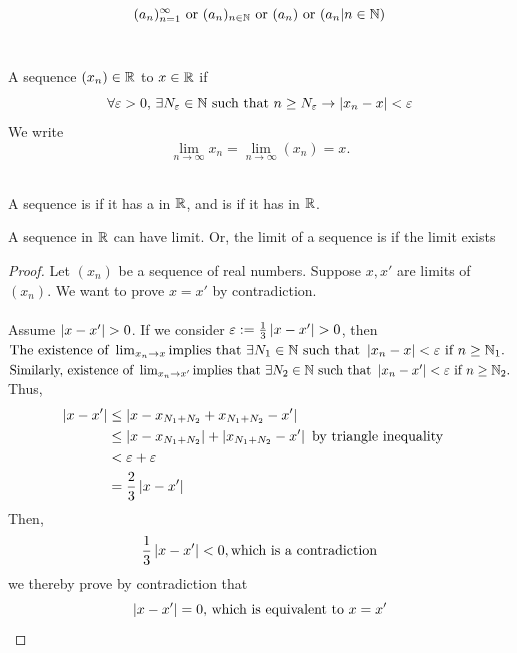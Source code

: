 \documentclass[a4paper,12pt]{article}
\begin{document}
\begin{notation}

\[(a_n)_{n=1}^\infty  \text{ or }  (a_n)_{n\in\mathbb{N}}  \text{ or }  (a_n)  \text{ or }  (a_n|n\in \mathbb{N})\]\\
\end{notation}

\begin{definition}
    A sequence \((x_n)\in\mathbb{R}\)  to \(x\in\mathbb{R}\) if 
    \[\forall \varepsilon >0,\, \exists N_\varepsilon \in \mathbb{N} \text{ such that }n\ge N_\varepsilon \rightarrow\left\lvert x_n - x\right\rvert <\varepsilon\]
    We write \[\lim_{n\to\infty}x_n = \lim_{n\to\infty}(x_n) = x.\]\\
\end{definition}

\begin{definition}
    A sequence is  if it has a  in \(\mathbb{R}\), and is  if it 
    has  in $\mathbb{R}$.\\
\end{definition}

\newpage
\begin{theorem}
    A sequence in $\mathbb{R}$ can have  limit. Or, the limit of a sequence is  if the limit exists 
\end{theorem}
\begin{proof}
    Let \((x_n)\) be a sequence of real numbers. Suppose \(x,x'\) are limits of \((x_n)\). We want to prove \(x = x'\) by contradiction.
    \\\\Assume \(\left\lvert x-x'\right\rvert > 0\). If we consider \(\varepsilon := \frac{1}{3}\left\lvert x-x'\right\rvert>0\), then\\
    \indent \(\text{The existence of } \lim_{x_n \to x}\text{implies that } \exists N_1 \in \mathbb{N} \text{ such that } \left\lvert x_n-x\right\rvert < \varepsilon\text{ if }n\ge \mathbb{N}_1. \)\\
    \indent \(\text{Similarly, existence of } \lim_{x_n \to x'} \text{implies that } \exists N_2 \in \mathbb{N} \text{ such that } \left\lvert x_n-x'\right\rvert < \varepsilon\text{ if }n\ge \mathbb{N}_2. \)\\
    Thus,
    \begin{align*}
        \left\lvert x-x'\right\rvert & \le \left\lvert x-x_{N_1+N_2}+x_{N_1+N_2}-x'\right\rvert & \\
                   & \le \left\lvert x-x_{N_1+N_2}\right\rvert+\left\lvert x_{N_1+N_2}-x'\right\rvert \text{ by triangle inequality}\\
                   & < \varepsilon+\varepsilon \\
                   & = \frac{2}{3}\left\lvert x-x'\right\rvert
    \end{align*}
    Then, 
    \[\frac{1}{3}\left\lvert x-x'\right\rvert<0,\text{which is a contradiction}\]
    we thereby prove by contradiction that
    \[\left\lvert x-x'\right\rvert = 0\text{, which is equivalent to } x=x'\]
\end{proof}
\end{document}
